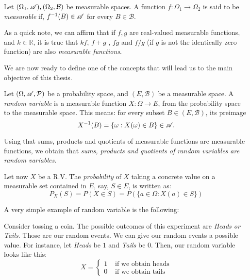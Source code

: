 \begin{ndef}
Let $(\Omega_1, \mathscr{A}),(\Omega_2, \mathcal B)$ be measurable spaces. A function $f: \Omega_1 \to \Omega_2$ is said to be \emph{measurable} if, $f^{-1}(B) \in \mathscr{A}$ for every $B \in \mathcal B$.
\end{ndef}

As a quick note, we can affirm that if $f,g$ are real-valued measurable functions, and $k \in \mathbb R$, it is true that $kf$, $f+g$ , $fg$ and $f/g$ (if $g$ is not the identically zero function) are also \emph{measurable functions}.

We are now ready to define one of the concepts that will lead us to the main objective of this thesis.

\begin{ndef}
Let $(\Omega,\mathscr{A},\mathcal{P})$ be a probability space, and $(E,\mathcal B)$ be a measurable space. 
A \emph{random variable} is a measurable function $X: \Omega \to E$, from the probability space to the measurable space. This means: for every subset $B \in (E,\mathcal B)$, its preimage
$$
X^{-1}(B) = \{\omega : X(\omega) \in B\} \in \mathscr{A} .
$$
\end{ndef}

Using that sums, products and quotients of measurable functions are measurable functions, we obtain that \emph{sums, products and quotients of random variables are random variables}.

Let now $X$ be a R.V. The \emph{probability} of $X$ taking a concrete value on a measurable set contained in $E$, say, $S \in E$, is written as:
$$
P_X(S) = P(X \in S) = P(\{a \in \Omega : X(a) \in S\})
$$

A very simple example of random variable is the following:

\begin{nexample}
  Consider tossing a coin. The possible outcomes of this experiment are \emph{Heads or Tails}. Those are our random events. We can give our random events a possible value. For instance, let \emph{Heads} be $1$ and \emph{Tails} be 0. Then, our random variable looks like this:
  \begin{equation*}
      X  = \left\{ \begin{aligned}
  1 & \text{ if we obtain heads} \\
  0 & \text{ if we obtain tails}
\end{aligned}\right.
  \end{equation*}

\end{nexample}

